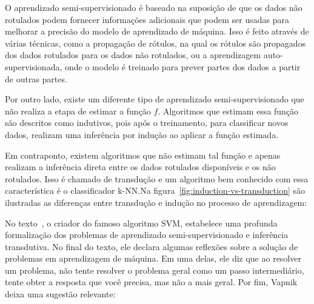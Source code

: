 O aprendizado semi-supervisionado é baseado na suposição de que os
dados não rotulados podem fornecer informações adicionais que podem
ser usadas para melhorar a precisão do modelo de aprendizado de
máquina. Isso é feito através de várias técnicas, como a propagação de
rótulos, na qual os rótulos são propagados dos dados rotulados para os
dados não rotulados, ou a aprendizagem auto-supervisionada, onde o
modelo é treinado para prever partes dos dados a partir de outras
partes.

Por outro lado, existe um diferente tipo de aprendizado
semi-supervisionado que não realiza a etapa de estimar a função $ f
$. Algoritmos que estimam essa função são descritos como indutivos,
pois após o treinamento, para classificar novos dados, realizam uma
inferência por indução ao aplicar a função estimada.

Em contraponto, existem algoritmos que não estimam tal função e apenas
realizam a inferência direta entre os dados rotulados disponíveis e os
não rotulados. Isso é chamado de transdução e um algoritmo bem
conhecido com essa característica é o classificador \gls{k-NN}.\@ Na
figura~\ref{fig:induction-vs-transduction} são ilustradas as
diferenças entre transdução e indução no processo de aprendizagem:


\begin{figure}[h!]
        \captionsetup{width=12cm}
		\centering
\end{figure}


No texto~\cite{vapnik2006semi}, o criador do famoso algoritmo SVM,
estabelece uma profunda formalização dos problemas de aprendizado
semi-supervisionado e inferência transdutiva. No final do texto, ele declara
algumas reflexões sobre a solução de problemas em aprendizagem de
máquina. Em uma delas, ele diz que ao resolver um problema, não tente
resolver o problema geral como um passo intermediário, tente obter a
resposta que você precisa, mas não a mais geral. Por fim, Vapnik
deixa uma sugestão relevante:



